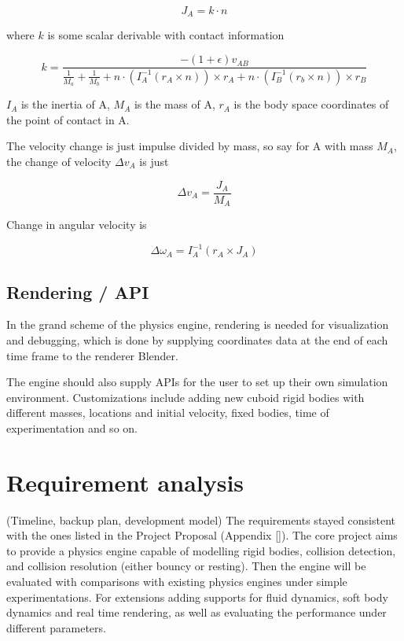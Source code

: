 \documentclass[runningheads]{llncs}
\begin{document}
\begin{equation}
J_A = k \cdot n
\end{equation}

where $k$ is some scalar derivable with contact information

\begin{equation}
k=\frac{-(1+\epsilon)v_{AB}}{\frac{1}{M_a}+\frac{1}{M_b}+n\cdot (I_A^{-1}(r_A\times n)) \times r_A + n\cdot (I_B^{-1}(r_b \times n)) \times r_B}
\end{equation}

$I_A$ is the inertia of A, $M_A$ is the mass of A, $r_A$ is the body space coordinates of the point of contact in A.

The velocity change is just impulse divided by mass, so say for A with mass $M_A$, the change of velocity $\Delta v_A$ is just

\begin{equation}
\Delta v_A = \frac{J_A}{M_A}
\end{equation}

Change in angular velocity is

\begin{equation}
\Delta \omega_A = I_A^{-1} (r_A \times J_A)
\end{equation}

\subsection{Rendering / API}

In the grand scheme of the physics engine, rendering is needed for visualization and debugging, which is done by supplying coordinates data at the end of each time frame to the renderer Blender.

The engine should also supply APIs for the user to set up their own simulation environment. Customizations include adding new cuboid rigid bodies with different masses, locations and initial velocity, fixed bodies, time of experimentation and so on.

\section{Requirement analysis}

(Timeline, backup plan, development model)
The requirements stayed consistent with the ones listed in the Project Proposal (Appendix []). The core project aims to provide a physics engine capable of modelling rigid bodies, collision detection, and collision resolution (either bouncy or resting). Then the engine will be evaluated with comparisons with existing physics engines under simple experimentations. For extensions adding supports for fluid dynamics, soft body dynamics and real time rendering, as well as evaluating the performance under different parameters.
\end{document}
